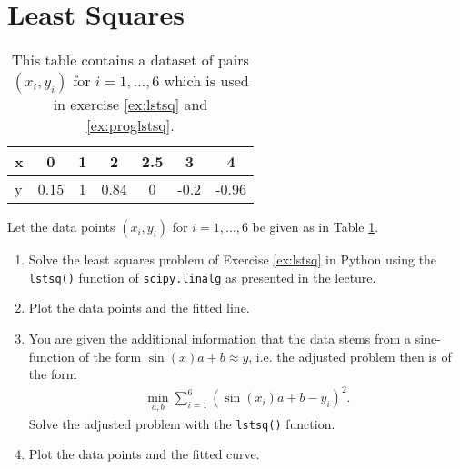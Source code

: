 \section{Least Squares}
\begin{table}[h]
	\centering
	\begin{tabular}{l|c c c c c c}
		x&0&1&2&2.5&3&4\\
		\hline
		y&0.15&1&0.84&0&-0.2&-0.96
	\end{tabular}
	\caption{This table contains a dataset of pairs $(x_i, y_i)$ for $i = 1,\dots,6$ which is used in exercise \ref{ex:lstsq} and \ref{ex:proglstsq}.}
	\label{tab:data}
\end{table}
\label{ex:proglstsq}
Let the data points $(x_i, y_i)$ for $i=1,\dots,6$ be given as in Table \ref{tab:data}.
\begin{enumerate}
	\item Solve the least squares problem of Exercise \ref{ex:lstsq} in Python using the \verb|lstsq()| function of 
	\verb|scipy.linalg| as presented in the lecture.
	\item Plot the data points and the fitted line.
	\item You are given the additional information that the data stems from a sine-function of the form $ \sin(x)a + b \approx y$, i.e. the adjusted problem then is of the form
	\begin{align*}
	\min \limits_{a,b} \sum_{i=1}^6 ( \sin(x_i)a + b - y_i)^2.
	\end{align*}
	Solve the adjusted problem with the \verb|lstsq()| function.
	\item Plot the data points and the fitted curve.
\end{enumerate}
